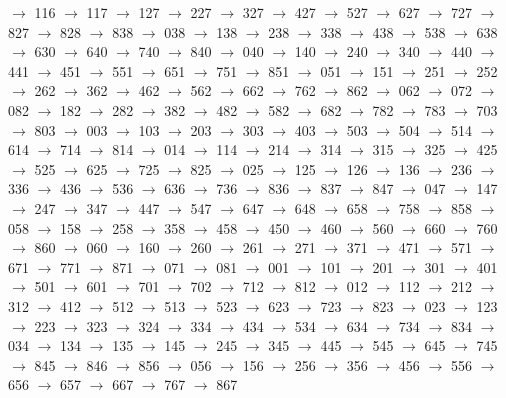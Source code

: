 $\rightarrow$ 116 $\rightarrow$ 117 $\rightarrow$ 127 $\rightarrow$ 227 $\rightarrow$ 327 $\rightarrow$ 427 $\rightarrow$ 527 $\rightarrow$ 627 $\rightarrow$ 727 $\rightarrow$ 827 $\rightarrow$ 828 $\rightarrow$ 838 $\rightarrow$ 038 $\rightarrow$ 138 $\rightarrow$ 238 $\rightarrow$ 338 $\rightarrow$ 438 $\rightarrow$ 538 $\rightarrow$ 638 $\rightarrow$ 630 $\rightarrow$ 640 $\rightarrow$ 740 $\rightarrow$ 840 $\rightarrow$ 040 $\rightarrow$ 140 $\rightarrow$ 240 $\rightarrow$ 340 $\rightarrow$ 440 $\rightarrow$ 441 $\rightarrow$ 451 $\rightarrow$ 551 $\rightarrow$ 651 $\rightarrow$ 751 $\rightarrow$ 851 $\rightarrow$ 051 $\rightarrow$ 151 $\rightarrow$ 251 $\rightarrow$ 252 $\rightarrow$ 262 $\rightarrow$ 362 $\rightarrow$ 462 $\rightarrow$ 562 $\rightarrow$ 662 $\rightarrow$ 762 $\rightarrow$ 862 $\rightarrow$ 062 $\rightarrow$ 072 $\rightarrow$ 082 $\rightarrow$ 182 $\rightarrow$ 282 $\rightarrow$ 382 $\rightarrow$ 482 $\rightarrow$ 582 $\rightarrow$ 682 $\rightarrow$ 782 $\rightarrow$ 783 $\rightarrow$ 703 $\rightarrow$ 803 $\rightarrow$ 003 $\rightarrow$ 103 $\rightarrow$ 203 $\rightarrow$ 303 $\rightarrow$ 403 $\rightarrow$ 503 $\rightarrow$ 504 $\rightarrow$ 514 $\rightarrow$ 614 $\rightarrow$ 714 $\rightarrow$ 814 $\rightarrow$ 014 $\rightarrow$ 114 $\rightarrow$ 214 $\rightarrow$ 314 $\rightarrow$ 315 $\rightarrow$ 325 $\rightarrow$ 425 $\rightarrow$ 525 $\rightarrow$ 625 $\rightarrow$ 725 $\rightarrow$ 825 $\rightarrow$ 025 $\rightarrow$ 125 $\rightarrow$ 126 $\rightarrow$ 136 $\rightarrow$ 236 $\rightarrow$ 336 $\rightarrow$ 436 $\rightarrow$ 536 $\rightarrow$ 636 $\rightarrow$ 736 $\rightarrow$ 836 $\rightarrow$ 837 $\rightarrow$ 847 $\rightarrow$ 047 $\rightarrow$ 147 $\rightarrow$ 247 $\rightarrow$ 347 $\rightarrow$ 447 $\rightarrow$ 547 $\rightarrow$ 647 $\rightarrow$ 648 $\rightarrow$ 658 $\rightarrow$ 758 $\rightarrow$ 858 $\rightarrow$ 058 $\rightarrow$ 158 $\rightarrow$ 258 $\rightarrow$ 358 $\rightarrow$ 458 $\rightarrow$ 450 $\rightarrow$ 460 $\rightarrow$ 560 $\rightarrow$ 660 $\rightarrow$ 760 $\rightarrow$ 860 $\rightarrow$ 060 $\rightarrow$ 160 $\rightarrow$ 260 $\rightarrow$ 261 $\rightarrow$ 271 $\rightarrow$ 371 $\rightarrow$ 471 $\rightarrow$ 571 $\rightarrow$ 671 $\rightarrow$ 771 $\rightarrow$ 871 $\rightarrow$ 071 $\rightarrow$ 081 $\rightarrow$ 001 $\rightarrow$ 101 $\rightarrow$ 201 $\rightarrow$ 301 $\rightarrow$ 401 $\rightarrow$ 501 $\rightarrow$ 601 $\rightarrow$ 701 $\rightarrow$ 702 $\rightarrow$ 712 $\rightarrow$ 812 $\rightarrow$ 012 $\rightarrow$ 112 $\rightarrow$ 212 $\rightarrow$ 312 $\rightarrow$ 412 $\rightarrow$ 512 $\rightarrow$ 513 $\rightarrow$ 523 $\rightarrow$ 623 $\rightarrow$ 723 $\rightarrow$ 823 $\rightarrow$ 023 $\rightarrow$ 123 $\rightarrow$ 223 $\rightarrow$ 323 $\rightarrow$ 324 $\rightarrow$ 334 $\rightarrow$ 434 $\rightarrow$ 534 $\rightarrow$ 634 $\rightarrow$ 734 $\rightarrow$ 834 $\rightarrow$ 034 $\rightarrow$ 134 $\rightarrow$ 135 $\rightarrow$ 145 $\rightarrow$ 245 $\rightarrow$ 345 $\rightarrow$ 445 $\rightarrow$ 545 $\rightarrow$ 645 $\rightarrow$ 745 $\rightarrow$ 845 $\rightarrow$ 846 $\rightarrow$ 856 $\rightarrow$ 056 $\rightarrow$ 156 $\rightarrow$ 256 $\rightarrow$ 356 $\rightarrow$ 456 $\rightarrow$ 556 $\rightarrow$ 656 $\rightarrow$ 657 $\rightarrow$ 667 $\rightarrow$ 767 $\rightarrow$ 867 